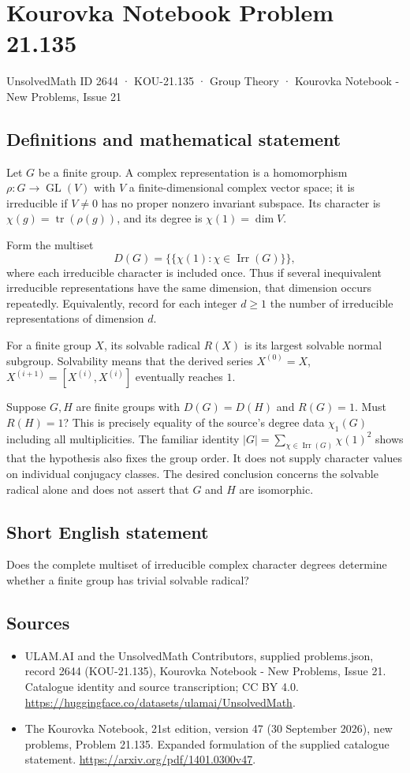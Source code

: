 \documentclass[11pt,a4paper]{article}
\begin{document}
\section*{Kourovka Notebook Problem 21.135}\label{2644}
{\small UnsolvedMath ID 2644 · KOU-21.135 · Group Theory · Kourovka Notebook - New Problems, Issue 21}
\subsection{Definitions and mathematical statement}
Let $G$ be a finite group. A complex representation is a homomorphism $\rho:G\to\operatorname{GL}(V)$ with $V$ a finite-dimensional complex vector space; it is irreducible if $V\ne0$ has no proper nonzero invariant subspace. Its character is $\chi(g)=\operatorname{tr}(\rho(g))$, and its degree is $\chi(1)=\dim V$.

Form the multiset
\[
 D(G)=\{\!\{\chi(1):\chi\in\operatorname{Irr}(G)\}\!\},
\]
where each irreducible character is included once. Thus if several inequivalent irreducible representations have the same dimension, that dimension occurs repeatedly. Equivalently, record for each integer $d\ge1$ the number of irreducible representations of dimension $d$.

For a finite group $X$, its solvable radical $R(X)$ is its largest solvable normal subgroup. Solvability means that the derived series $X^{(0)}=X$, $X^{(i+1)}=[X^{(i)},X^{(i)}]$ eventually reaches $1$.

Suppose $G,H$ are finite groups with $D(G)=D(H)$ and $R(G)=1$. Must $R(H)=1$? This is precisely equality of the source's degree data $\chi_1(G)$ including all multiplicities. The familiar identity $|G|=\sum_{\chi\in\operatorname{Irr}(G)}\chi(1)^2$ shows that the hypothesis also fixes the group order. It does not supply character values on individual conjugacy classes. The desired conclusion concerns the solvable radical alone and does not assert that $G$ and $H$ are isomorphic.
\subsection{Short English statement}
Does the complete multiset of irreducible complex character degrees determine whether a finite group has trivial solvable radical?
\subsection{Sources}
\begin{itemize}
\item[S1] ULAM.AI and the UnsolvedMath Contributors, supplied problems.json, record 2644 (KOU-21.135), Kourovka Notebook - New Problems, Issue 21. Catalogue identity and source transcription; CC BY 4.0.
\url{https://huggingface.co/datasets/ulamai/UnsolvedMath}.
\item[S2] The Kourovka Notebook, 21st edition, version 47 (30 September 2026), new problems, Problem 21.135. Expanded formulation of the supplied catalogue statement.
\url{https://arxiv.org/pdf/1401.0300v47}.
\end{itemize}
\end{document}
